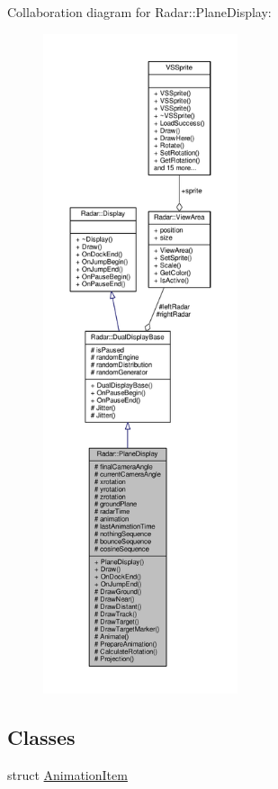 Collaboration diagram for Radar\+:\+:Plane\+Display\+:
\nopagebreak
\begin{figure}[H]
\begin{center}
\leavevmode
\includegraphics[height=550pt]{d8/d70/classRadar_1_1PlaneDisplay__coll__graph}
\end{center}
\end{figure}
\subsection*{Classes}
\begin{DoxyCompactItemize}
\item 
struct \hyperlink{structRadar_1_1PlaneDisplay_1_1AnimationItem}{Animation\+Item}
\end{DoxyCompactItemize}
